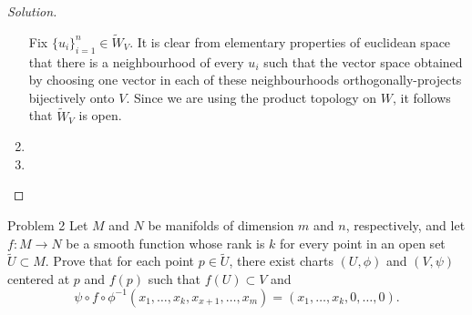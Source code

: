 \begin{proof}[Solution]
\begin{enumerate}
	Fix \(\{u_i\}_{i=1}^n \in \widetilde{W}_V\). It is clear from elementary properties of euclidean space that there is a neighbourhood of every \(u_i\) such that the vector space obtained by choosing one vector in each of these neighbourhoods orthogonally-projects bijectively onto \(V\). Since we are using the product topology on \(W\), it follows that \(\widetilde{W}_V\) is open.
\item %


\item 
\end{enumerate}



\end{proof}

\begin{thing1}{Problem 2}\label{p:2}\leavevmode
Let \(M\) and $N$ be manifolds of dimension $m$ and $n$, respectively, and let \(f:M \to N\) be a smooth function whose rank is \(k\) for every point in an open set \(\tilde{U} \subset M\). Prove that for each point \(p \in \tilde{U}\), there exist charts \((U, \phi)\) and \((V,\psi)\) centered at \(p\) and \(f(p)\) such that \(f(U) \subset V\) and
\[\psi \circ f \circ \phi^{-1}(x_1,\ldots,x_k,x_{x+1},\ldots,x_m)=(x_1,\ldots,x_k,0,\ldots,0).\]
\end{thing1}


